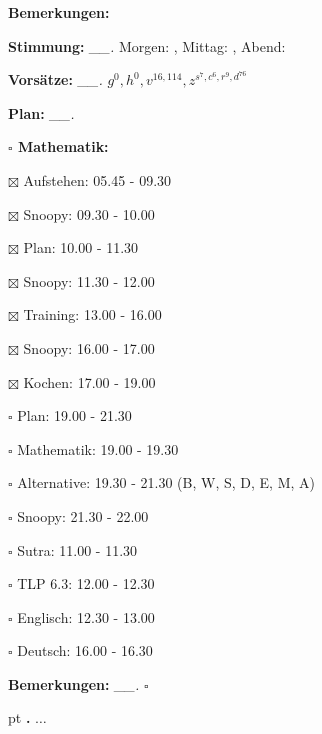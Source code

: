 \documentclass[10pt,a4paper]{article}
\newcounter{notec}
\newcommand\notep[1]{%
  \stepcounter{notec}
  \vskip #1pt
  {\bf\arabic{notec}.}
}
\newcommand\prop[1] {{\color {alizarin} {\bf #1}}}             %
\newcommand\draf[1] {{\color {amber(sae/ece)} {\bf #1}}}       %
\newcommand\mand[1] {{\color {burntorange} {\bf #1}}}          %
\newcommand\topspace{\vskip -15pt \hskip 20pt}
\newcommand\bottomspace{\vskip 4pt}
\newcommand\n[1] { {\sl #1.} \hskip 5pt }
\begin{document}
\begin{mdframed}[style=daystyle]
\begin{labeling}{{\mand {Bemerkungen:}}}
  \item[{\mand {Stimmung:}}]     \n{\_\_} Morgen: , Mittag: , Abend: 
  \item[{\mand {Vorsätze:}}]     \n{\_\_} $g^{0}, h^{0}, v^{16,114}, z^{s^{7},c^{6},r^{9},d^{76}}$
  \item[{\mand {Plan:}}]         \n{\_\_}
    \topspace
    \begin{minipage}{0.75\textwidth}  
      \begin{labeling}{\prop {$\square$ {Mathematik:}}} 
        \setlength\itemsep{-3pt}
      \item[$\boxtimes$ Aufstehen:]   05.45 - 09.30
        
      \item[$\boxtimes$ Snoopy:]      09.30 - 10.00        
      \item[$\boxtimes$ Plan:]        10.00 - 11.30
        
      \item[$\boxtimes$ Snoopy:]      11.30 - 12.00
      \item[$\boxtimes$ Training:]    13.00 - 16.00
        
      \item[$\boxtimes$ Snoopy:]      16.00 - 17.00
      \item[$\boxtimes$ Kochen:]      17.00 - 19.00
      \item[$\square$ Plan:]        19.00 - 21.30
        
      \item[$\square$ Mathematik:]  19.00 - 19.30        
      \item[$\square$ Alternative:] 19.30 - 21.30 (B, W, S, D, E, M, A)
        
      \item[$\square$ Snoopy:]      21.30 - 22.00
        
      \item[$\square$ Sutra:]       11.00 - 11.30
        
      \item[$\square$ TLP 6.3:]     12.00 - 12.30
      \item[$\square$ Englisch:]    12.30 - 13.00
      \item[$\square$ Deutsch:]     16.00 - 16.30
        
      \end{labeling}
    \end{minipage}
    \bottomspace
  \item[{\mand {Bemerkungen:}}]  \n{\_\_} {\draf {$\square$}}
  \end{labeling}
    
  \setcounter{notec}{0}
  
  \notep 0 $\ldots$

\end{mdframed}
\end{document}
